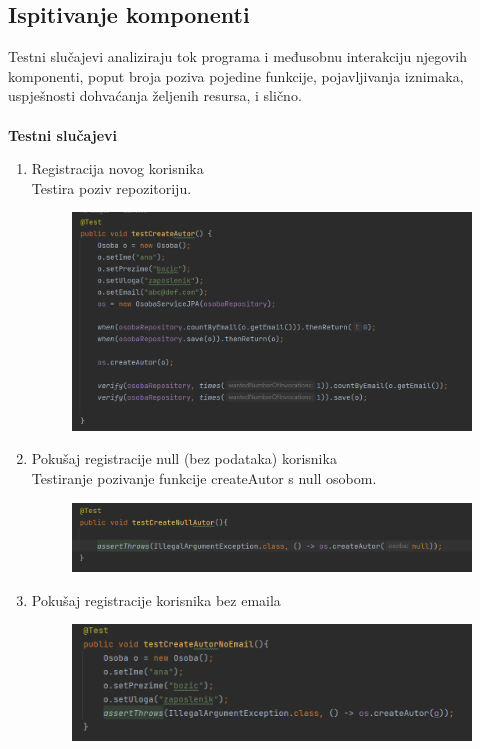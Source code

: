 			\subsection{Ispitivanje komponenti}
			\textitSvi 
        Testni slučajevi analiziraju tok programa i međusobnu interakciju njegovih komponenti, poput broja poziva pojedine funkcije, pojavljivanja iznimaka, uspješnosti dohvaćanja željenih resursa, i slično.\\
        \\
        \textbf{Testni slučajevi} \\
        \begin{enumerate}
    \item Registracija novog korisnika\\
    Testira poziv repozitoriju.
    \begin{figure}[H]
        \includegraphics[scale=0.30]{slike/deploy/backTest1.png}
        \centering
        \label{fig:promjene1}
    \end{figure}

    \item Pokušaj registracije null (bez podataka) korisnika\\
    Testiranje pozivanje funkcije createAutor s null osobom.
    \begin{figure}[H]
        \includegraphics[scale=0.30]{slike/deploy/backTest2.png}
        \centering
        \label{fig:promjene2}
    \end{figure}

    \item Pokušaj registracije korisnika bez emaila
    \begin{figure}[H]
        \includegraphics[scale=0.30]{slike/deploy/backTest3.png}
        \centering
        \label{fig:promjene3}
    \end{figure}


\end{enumerate}
